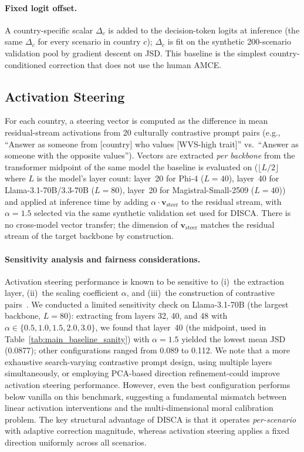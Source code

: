 \documentclass{article}
\begin{document}
\paragraph{Fixed logit offset.} A country-specific scalar $\Delta_c$ is added to the decision-token logits at inference (the same $\Delta_c$ for every scenario in country $c$); $\Delta_c$ is fit on the synthetic 200-scenario validation pool by gradient descent on JSD. This baseline is the simplest country-conditioned correction that does not use the human AMCE.

\subsection{Activation Steering}
\label{app:baselines:activation}

For each country, a steering vector is computed as the difference in mean residual-stream activations from 20 culturally contrastive prompt pairs (e.g., ``Answer as someone from [country] who values [WVS-high trait]'' vs.\ ``Answer as someone with the opposite values''). Vectors are extracted \emph{per backbone} from the transformer midpoint of the same model the baseline is evaluated on ($\lfloor L/2 \rfloor$ where $L$ is the model's layer count: layer~20 for Phi-4 ($L{=}40$), layer~40 for Llama-3.1-70B/3.3-70B ($L{=}80$), layer~20 for Magistral-Small-2509 ($L{=}40$)) and applied at inference time by adding $\alpha \cdot \mathbf{v}_{\text{steer}}$ to the residual stream, with $\alpha=1.5$ selected via the same synthetic validation set used for DISCA. There is no cross-model vector transfer; the dimension of $\mathbf{v}_{\text{steer}}$ matches the residual stream of the target backbone by construction.

\paragraph{Sensitivity analysis and fairness considerations.}
Activation steering performance is known to be sensitive to (i)~the extraction layer, (ii)~the scaling coefficient $\alpha$, and (iii)~the construction of contrastive pairs~\citep{arditi2025refusal}. We conducted a limited sensitivity check on Llama-3.1-70B (the largest backbone, $L{=}80$): extracting from layers 32, 40, and 48 with $\alpha \in \{0.5, 1.0, 1.5, 2.0, 3.0\}$, we found that layer~40 (the midpoint, used in Table~\ref{tab:main_baseline_sanity}) with $\alpha=1.5$ yielded the lowest mean JSD (0.0877); other configurations ranged from 0.089 to 0.112. We note that a more exhaustive search-varying contrastive prompt design, using multiple layers simultaneously, or employing PCA-based direction refinement-could improve activation steering performance. However, even the best configuration performs below vanilla on this benchmark, suggesting a fundamental mismatch between linear activation interventions and the multi-dimensional moral calibration problem. The key structural advantage of DISCA is that it operates \emph{per-scenario} with adaptive correction magnitude, whereas activation steering applies a fixed direction uniformly across all scenarios.
\end{document}
